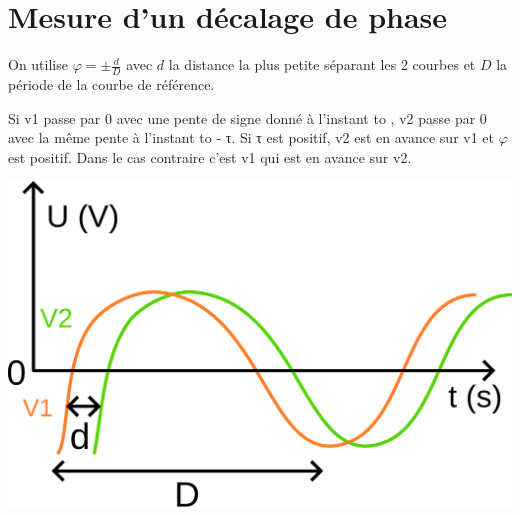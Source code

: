 \documentclass[french]{yLectureNote}
\begin{document}
\section{Mesure d'un décalage de phase}
 \begin{theorem}
  On utilise \(\varphi = \pm \frac{d}{D}\) avec \(d\) la distance la plus petite séparant les 2 courbes et \(D\) la période de la courbe de référence.
 \end{theorem}
Si v1 passe
par 0 avec une pente de signe donné à l'instant to , v2 passe par 0 avec la même pente à l'instant to - τ.
Si τ est positif, v2 est en avance sur v1 et \(\varphi\) est positif. Dans le cas contraire c'est v1 qui est en avance sur v2.

\includegraphics[scale=0.5]{path2}
\end{document}
